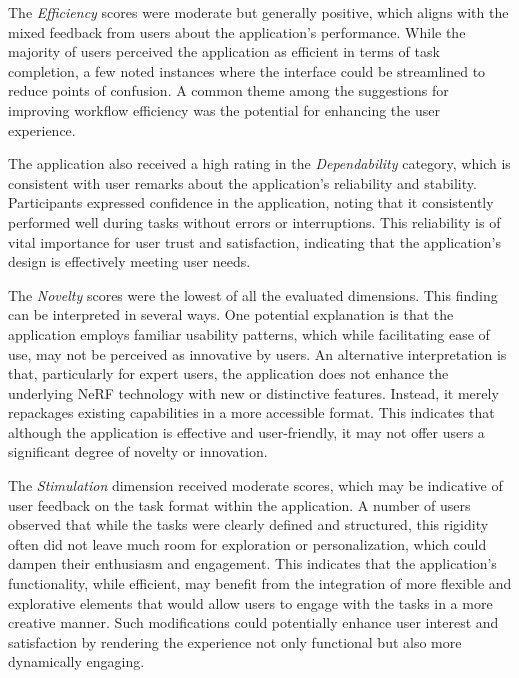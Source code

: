 The \emph{Efficiency} scores were moderate but generally positive, which aligns with the mixed feedback from users about the application's performance. 
While the majority of users perceived the application as efficient in terms of task completion, a few noted instances where the interface could be streamlined to reduce points of confusion.
A common theme among the suggestions for improving workflow efficiency was the potential for enhancing the user experience.

The application also received a high rating in the \emph{Dependability} category, which is consistent with user remarks about the application’s reliability and stability.
Participants expressed confidence in the application, noting that it consistently performed well during tasks without errors or interruptions. 
This reliability is of vital importance for user trust and satisfaction, indicating that the application’s design is effectively meeting user needs.

The \emph{Novelty} scores were the lowest of all the evaluated dimensions. This finding can be interpreted in several ways. 
One potential explanation is that the application employs familiar usability patterns, which while facilitating ease of use, may not be perceived as innovative by users. 
An alternative interpretation is that, particularly for expert users, the application does not enhance the underlying NeRF technology with new or distinctive features. Instead, it merely repackages existing capabilities in a more accessible format. 
This indicates that although the application is effective and user-friendly, it may not offer users a significant degree of novelty or innovation.

The \emph{Stimulation} dimension received moderate scores, which may be indicative of user feedback on the task format within the application. 
A number of users observed that while the tasks were clearly defined and structured, this rigidity often did not leave much room for exploration or personalization, which could dampen their enthusiasm and engagement. 
This indicates that the application's functionality, while efficient, may benefit from the integration of more flexible and explorative elements that would allow users to engage with the tasks in a more creative manner. 
Such modifications could potentially enhance user interest and satisfaction by rendering the experience not only functional but also more dynamically engaging.

